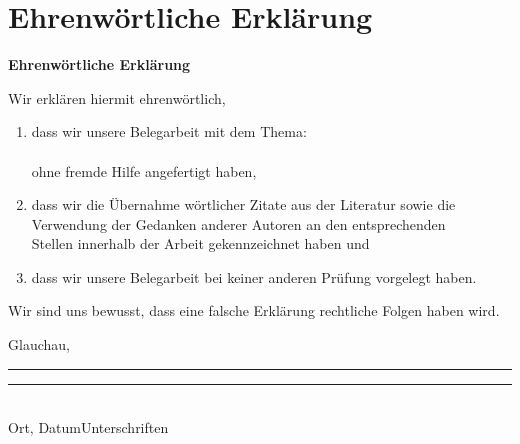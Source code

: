 \cleardoublepage 
\section{Ehrenwörtliche Erklärung}
    \vspace*{1cm}
    \begin{center}
    \huge\textbf{Ehrenwörtliche Erklärung}\\
    \end{center}
    \vspace*{1cm}
    \normalsize
    Wir erklären hiermit ehrenwörtlich,

    \begin{enumerate}
        \vspace{1cm}
        \item dass wir unsere Belegarbeit mit dem Thema:\\
    
    \textbf{\titel }\\

    ohne fremde Hilfe angefertigt haben,
    \item dass wir die Übernahme wörtlicher Zitate aus der Literatur sowie die\\           
    Verwendung der Gedanken anderer Autoren an den entsprechenden\\
    Stellen innerhalb der Arbeit gekennzeichnet haben und
    \item dass wir unsere Belegarbeit bei keiner anderen Prüfung vorgelegt haben.\\[1,5cm]
\end{enumerate}
Wir sind uns bewusst, dass eine falsche Erklärung rechtliche Folgen haben wird.\\[1,5cm]
        
\vspace*{10mm}

Glauchau, \abgabedatum
\par\noindent\rule{0.35\columnwidth}{0.4pt}\hspace{0.05\columnwidth}\rule{0.6\columnwidth}{0.4pt}\\
Ort, Datum\hspace{0.27\columnwidth}Unterschriften

